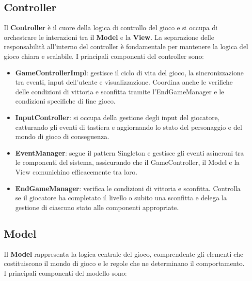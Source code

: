 \documentclass[a4paper,12pt]{report}
\begin{document}
	\subsection{Controller}
	
	Il \textbf{Controller} è il cuore della logica di controllo del gioco e si occupa di orchestrare le interazioni tra il \textbf{Model} e la \textbf{View}. La separazione delle responsabilità all'interno del controller è fondamentale per mantenere la logica del gioco chiara e scalabile. I principali componenti del controller sono:
	
	\begin{itemize} \item \textbf{GameControllerImpl}: gestisce il ciclo di vita del gioco, la sincronizzazione tra eventi, input dell’utente e visualizzazione. Coordina anche le verifiche delle condizioni di vittoria e sconfitta tramite l'EndGameManager e le condizioni specifiche di fine gioco. \item \textbf{InputController}: si occupa della gestione degli input del giocatore, catturando gli eventi di tastiera e aggiornando lo stato del personaggio e del mondo di gioco di conseguenza. \item \textbf{EventManager}: segue il pattern Singleton e gestisce gli eventi asincroni tra le componenti del sistema, assicurando che il GameController, il Model e la View comunichino efficacemente tra loro. \item \textbf{EndGameManager}: verifica le condizioni di vittoria e sconfitta. Controlla se il giocatore ha completato il livello o subito una sconfitta e delega la gestione di ciascuno stato alle componenti appropriate. \end{itemize}
	
	\subsection{Model}
	
	Il \textbf{Model} rappresenta la logica centrale del gioco, comprendente gli elementi che costituiscono il mondo di gioco e le regole che ne determinano il comportamento. I principali componenti del modello sono:
	
\end{document}
